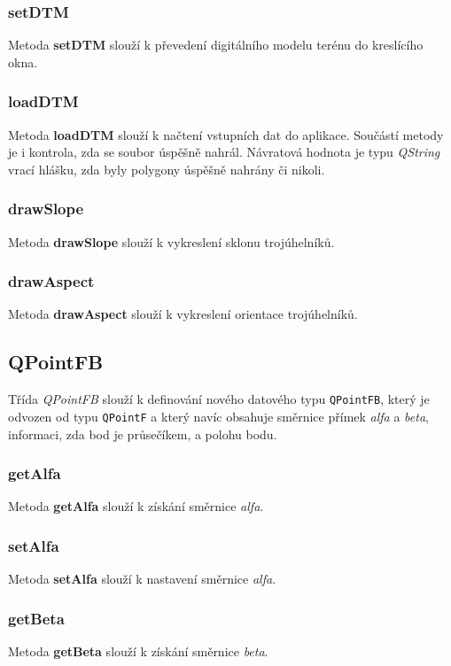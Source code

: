 \documentclass[a4paper, 12pt]{article}
\begin{document}
\subsubsection*{setDTM}
Metoda \textbf{setDTM} slouží k převedení digitálního modelu terénu do kreslícího okna.

\subsubsection*{loadDTM}
Metoda \textbf{loadDTM} slouží k načtení vstupních dat do aplikace. Součástí metody je i kontrola, zda se soubor úspěšně nahrál. Návratová hodnota je typu \textsl{QString} vrací hlášku, zda byly polygony úspěšně nahrány či nikoli.

\subsubsection*{drawSlope}
Metoda \textbf{drawSlope} slouží k vykreslení sklonu trojúhelníků.

\subsubsection*{drawAspect}
Metoda \textbf{drawAspect} slouží k vykreslení orientace trojúhelníků.


\subsection{QPointFB}
Třída \textit{QPointFB} slouží k definování nového datového typu \texttt{QPointFB}, který je odvozen od typu \texttt{QPointF} a který navíc obsahuje směrnice přímek \textsl{alfa} a \textsl{beta}, informaci, zda bod je průsečíkem, a polohu bodu.

\subsubsection*{getAlfa}
Metoda \textbf{getAlfa} slouží k získání směrnice \textsl{alfa}.

\subsubsection*{setAlfa}
Metoda \textbf{setAlfa} slouží k nastavení směrnice \textsl{alfa}. 

\subsubsection*{getBeta}
Metoda \textbf{getBeta} slouží k získání směrnice \textsl{beta}.
\end{document}
